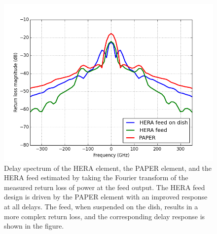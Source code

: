 \documentclass[twocolumn]{emulateapj}
\begin{document}
\begin{figure}
\centering
\includegraphics[width=\linewidth]{plots/delay_spectrum_100_200_BH.png}
\caption{Delay spectrum of the HERA element, the PAPER element, and the HERA feed estimated by taking the Fourier transform of the measured return loss of power at the feed output. The HERA feed design is driven by the PAPER element with an improved response at all delays. The feed, when suspended on the dish, results in a more complex return loss, and the corresponding delay response is shown in the figure.} %
\label{fig:delay_spectrum}
\end{figure}
%
\end{document}
